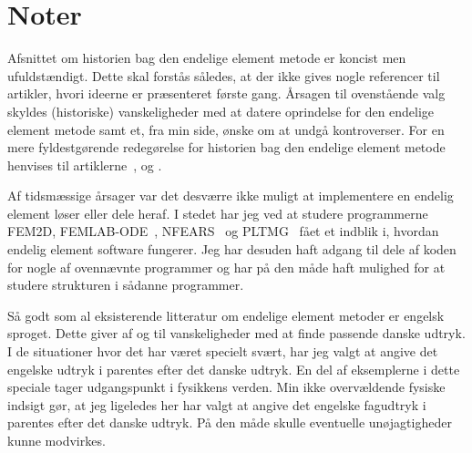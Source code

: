 \chapter*{Noter}

Afsnittet om historien bag den endelige element metode er koncist men
ufuldstændigt. Dette skal forstås således, at der ikke gives nogle
referencer til artikler, hvori ideerne er præsenteret første gang.
Årsagen til ovenstående valg skyldes (historiske) vanskeligheder med
at datere oprindelse for den endelige element metode samt et, fra min
side, ønske om at undgå kontroverser. For en mere fyldestgørende
redegørelse for historien bag den endelige element metode henvises til
artiklerne~\cite{babuska}, \cite{oden90} og \cite{zienkiewicz72}.  

Af tidsmæssige årsager var det desværre ikke muligt at implementere en
endelig ele\-ment løser eller dele heraf. I stedet har jeg ved at studere
programmerne FEM2D, FEMLAB-ODE~\cite{femlab-ode}, NFEARS~\cite{nfears}
og PLTMG~\cite{pltmg} fået et indblik i, hvordan endelig element
software fungerer. Jeg har desuden haft adgang til dele af koden for
nogle af ovennævnte programmer og har på den måde haft mulighed for at
studere strukturen i sådanne programmer. 

Så godt som al eksisterende litteratur om endelige element metoder er
engelsk sproget. Dette giver af og til vanskeligheder med at finde
passende danske udtryk. I de situationer hvor det har været specielt
svært, har jeg valgt at angive det engelske udtryk i parentes efter
det danske udtryk. En del
af eksemplerne i dette speciale tager udgangspunkt i fysikkens verden.
Min ikke overvældende fysiske indsigt gør, at jeg ligeledes her har valgt at
angive det engelske fagudtryk i parentes efter det danske udtryk. På den
måde skulle eventuelle unøjagtigheder kunne modvirkes. 